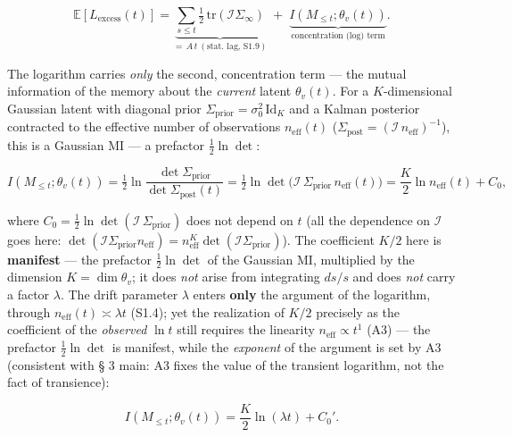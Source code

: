 \documentclass[12pt]{iopart}
\begin{document}
\begin{equation}\mathbb{E}[L_{\text{excess}}(t)] = \underbrace{\sum_{s\le t}\tfrac12\,\mathrm{tr}(\mathcal I\Sigma_\infty)}_{=\,A\,t\ (\text{stat. lag, S1.9})} \;+\; \underbrace{I(M_{\le t};\theta_v(t))}_{\text{concentration (log) term}}. \tag{S1.6a}\end{equation}



The logarithm carries \emph{only} the second, concentration term --- the mutual information of the memory about the \emph{current} latent \(\theta_v(t)\). For a \(K\)-dimensional Gaussian latent with diagonal prior \(\Sigma_{\text{prior}}=\sigma_0^2\,\mathrm{Id}_K\) and a Kalman posterior contracted to the effective number of observations \(n_{\text{eff}}(t)\) (\(\Sigma_{\text{post}}=(\mathcal I\,n_{\text{eff}})^{-1}\)), this is a Gaussian MI --- a prefactor \(\tfrac12\ln\det\):



\begin{equation}I(M_{\le t};\theta_v(t)) = \tfrac12\ln\frac{\det\Sigma_{\text{prior}}}{\det\Sigma_{\text{post}}(t)} = \tfrac12\ln\det\!\big(\mathcal I\,\Sigma_{\text{prior}}\,n_{\text{eff}}(t)\big) = \frac{K}{2}\ln n_{\text{eff}}(t) + C_0, \tag{S1.6b}\end{equation}



where \(C_0=\tfrac12\ln\det(\mathcal I\,\Sigma_{\text{prior}})\) does not depend on \(t\) (all the dependence on \(\mathcal I\) goes here: \(\det(\mathcal I\Sigma_{\text{prior}}n_{\text{eff}})=n_{\text{eff}}^K\det(\mathcal I\Sigma_{\text{prior}})\)). The coefficient \(K/2\) here is \textbf{manifest} --- the prefactor \(\tfrac12\ln\det\) of the Gaussian MI, multiplied by the dimension \(K=\dim\theta_v\); it does \emph{not} arise from integrating \(ds/s\) and does \emph{not} carry a factor \(\lambda\). The drift parameter \(\lambda\) enters \textbf{only} the argument of the logarithm, through \(n_{\text{eff}}(t)\asymp\lambda t\) (S1.4); yet the realization of \(K/2\) precisely as the coefficient of the \emph{observed} \(\ln t\) still requires the linearity \(n_{\text{eff}}\propto t^1\) (A3) --- the prefactor \(\tfrac12\ln\det\) is manifest, while the \emph{exponent} of the argument is set by A3 (consistent with § 3 main: A3 fixes the value of the transient logarithm, not the fact of transience):



\begin{equation}I(M_{\le t};\theta_v(t)) = \frac{K}{2}\ln(\lambda t) + C_0'. \tag{S1.6c}\end{equation}
\end{document}
